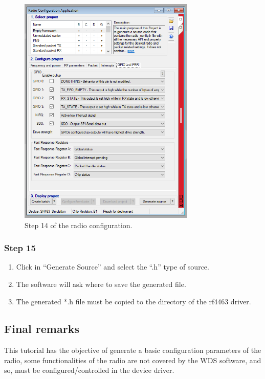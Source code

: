 \begin{figure}[!h]
	\begin{center}
		\includegraphics[width=0.75\textwidth]{figures/wds-tutorial/wds-tutorial-14.png}
		\caption{Step 14 of the radio configuration.}
		\label{fig:wds-tutorial-step-14}
	\end{center}
\end{figure}

\subsubsection{Step 15}

\begin{enumerate}
    \item Click in ``Generate Source'' and select the ``.h'' type of source.
    \item The software will ask where to save the generated file.
    \item The generated *.h file must be copied to the directory of the rf4463 driver.
\end{enumerate}

\subsection{Final remarks}

This tutorial has the objective of generate a basic configuration parameters of the radio, some functionalities of the radio are not covered by the WDS software, and so, must be configured/controlled in the device driver.

